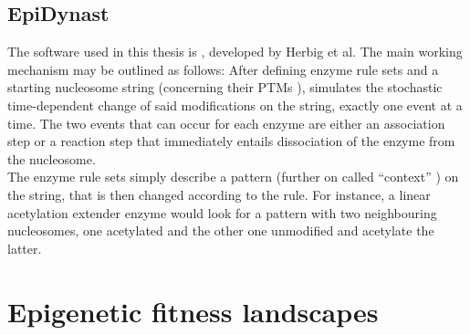         \subsection{EpiDynast}
            The software used in this thesis is \ed, developed by Herbig et al. %
            The main working mechanism may be outlined as follows: After defining enzyme rule sets and a starting nucleosome string (concerning their PTMs %
            ), \ed simulates the stochastic time-dependent change of said modifications on the string, exactly one event at a time. The two events that can occur for each enzyme are either an association step or a reaction step that immediately entails dissociation of the enzyme from the nucleosome.\\
            The enzyme rule sets simply describe a pattern (further on called “context” %
            ) on the string, that is then changed according to the rule. For instance, a linear acetylation extender enzyme %
            would look for a pattern with two neighbouring nucleosomes, one acetylated and the other one unmodified and acetylate the latter.\\

    \section{Epigenetic fitness landscapes} %
